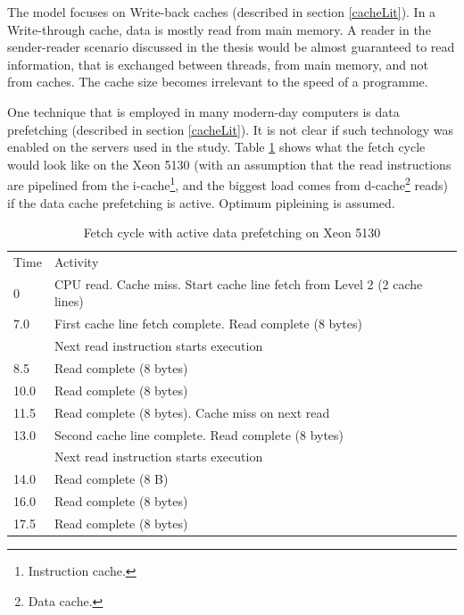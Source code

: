 The model focuses on Write-back caches (described in section \ref{cacheLit}). In a Write-through cache, data is mostly read from main memory. A reader in the sender-reader scenario discussed in the thesis would be almost guaranteed to read information, that is exchanged between threads, from main memory, and not from caches. The cache size becomes irrelevant to the speed of a programme.

One technique that is employed in many modern-day computers is data prefetching (described in section \ref{cacheLit}). It is not clear if such technology was enabled on the servers used in the study. Table \ref{prefetching1} shows what the fetch cycle would look like on the Xeon 5130 (with an assumption that the read instructions are pipelined from the i-cache\footnote{Instruction cache.}, and the biggest load comes from d-cache\footnote{Data cache.} reads) if the data cache prefetching is active. Optimum pipleining is assumed.

\begin{table}[h]
\caption{Fetch cycle with active data prefetching on Xeon 5130}
\begin{tabular}{ll}
Time & Activity                                                                                         \\
0    & CPU read. Cache miss. Start cache line fetch from Level 2 (2 cache lines)                               \\
7.0  & First cache line fetch complete. Read complete (8 bytes) \\
 & Next read instruction starts execution \\
8.5  & Read complete (8 bytes)                                                                          \\
10.0 & Read complete (8 bytes)                                                                          \\
11.5 & Read complete (8 bytes). Cache miss on next read                                                 \\
13.0 & Second cache line complete. Read complete (8 bytes) \\
 & Next read instruction starts execution      \\
14.0 & Read complete (8 B)                                                                              \\
16.0 & Read complete (8 bytes)                                                                          \\
17.5 & Read complete (8 bytes)                                                                         
\end{tabular}
\label{prefetching1}
\end{table}

